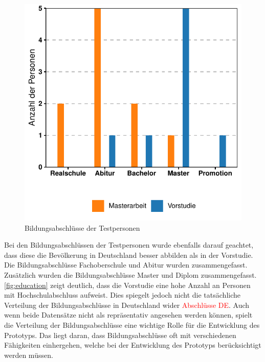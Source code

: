 \begin{figure}[!ht]
    \centering
    \includegraphics[width=0.7\columnwidth]{figures/education.pdf}
    \caption{\label{fig:education}Bildungsabschlüsse der Testpersonen}
\end{figure}

Bei den Bildungsabschlüssen der Testpersonen wurde ebenfalls darauf geachtet, dass diese die Bevölkerung in Deutschland besser abbilden als in der Vorstudie.
Die Bildungsabschlüsse Fachoberschule und Abitur wurden zusammengefasst.
Zusätzlich wurden die Bildungsabschlüsse Master und Diplom zusammengefasst.
\autoref{fig:education} zeigt deutlich, dass die Vorstudie eine hohe Anzahl an Personen mit Hochschulabschluss aufweist.
Dies spiegelt jedoch nicht die tatsächliche Verteilung der Bildungsabschlüsse in Deutschland wider \textcolor{red}{Abschlüsse DE}.
Auch wenn beide Datensätze nicht als repräsentativ angesehen werden können, spielt die Verteilung der Bildungsabschlüsse eine wichtige Rolle für die Entwicklung des Prototyps.
Das liegt daran, dass Bildungsabschlüsse oft mit verschiedenen Fähigkeiten einhergehen, welche bei der Entwicklung des Prototyps berücksichtigt werden müssen.
